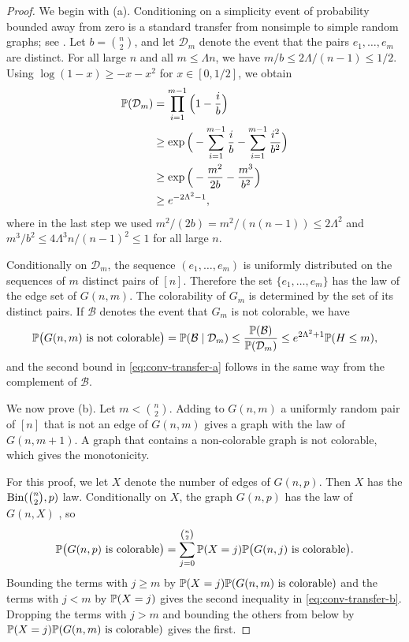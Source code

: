 \begin{proof}
We begin with (a). Conditioning on a simplicity event of probability bounded away from zero is a standard transfer from nonsimple to simple random graphs; see \cite[Section~2, paragraph on nonsimple graphs]{bayati2013combinatorial}. Let $b = \binom{n}{2}$, and let $\mathcal D_m$ denote the event that the pairs $e_1, \dots, e_m$ are distinct. For all large $n$ and all $m \le \Lambda n$, we have $m/b \le 2\Lambda/(n - 1) \le 1/2$. Using $\log(1 - x) \ge -x - x^2$ for $x \in [0, 1/2]$, we obtain
\[
\begin{aligned}
\mathbb P(\mathcal D_m) &= \prod_{i = 1}^{m - 1} \Big(1 - \frac{i}{b}\Big) \\
&\ge \exp\Big(-\sum_{i = 1}^{m - 1} \frac{i}{b} - \sum_{i = 1}^{m - 1} \frac{i^2}{b^2}\Big) \\
&\ge \exp\Big(-\frac{m^2}{2b} - \frac{m^3}{b^2}\Big) \\
&\ge e^{-2\Lambda^2 - 1},
\end{aligned}
\]
where in the last step we used $m^2/(2b) = m^2/(n(n - 1)) \le 2\Lambda^2$ and $m^3/b^2 \le 4\Lambda^3 n/(n - 1)^2 \le 1$ for all large $n$.

Conditionally on $\mathcal D_m$, the sequence $(e_1, \dots, e_m)$ is uniformly distributed on the sequences of $m$ distinct pairs of $[n]$. Therefore the set $\{e_1, \dots, e_m\}$ has the law of the edge set of $G(n, m)$. The colorability of $G_m$ is determined by the set of its distinct pairs. If $\mathcal B$ denotes the event that $G_m$ is not colorable, we have
\[
\mathbb P\big(G(n, m) \text{ is not colorable}\big) = \mathbb P(\mathcal B \mid \mathcal D_m) \le \frac{\mathbb P(\mathcal B)}{\mathbb P(\mathcal D_m)} \le e^{2\Lambda^2 + 1} \mathbb P(H \le m),
\]
and the second bound in \eqref{eq:conv-transfer-a} follows in the same way from the complement of $\mathcal B$.

We now prove (b). Let $m < \binom{n}{2}$. Adding to $G(n, m)$ a uniformly random pair of $[n]$ that is not an edge of $G(n, m)$ gives a graph with the law of $G(n, m + 1)$. A graph that contains a non-colorable graph is not colorable, which gives the monotonicity.

For this proof, we let $X$ denote the number of edges of $G(n, p)$. Then $X$ has the $\operatorname{Bin}(\binom n2, p)$ law. Conditionally on $X$, the graph $G(n, p)$ has the law of $G(n, X)$ \cite[Lemma~1.1]{frieze2016introduction}, so
\[
\mathbb P\big(G(n, p) \text{ is colorable}\big) = \sum_{j = 0}^{\binom{n}{2}} \mathbb P(X = j) \mathbb P\big(G(n, j) \text{ is colorable}\big).
\]
Bounding the terms with $j \ge m$ by $\mathbb P(X = j) \mathbb P(G(n, m) \text{ is colorable})$ and the terms with $j < m$ by $\mathbb P(X = j)$ gives the second inequality in \eqref{eq:conv-transfer-b}. Dropping the terms with $j > m$ and bounding the others from below by $\mathbb P(X = j) \mathbb P(G(n, m) \text{ is colorable})$ gives the first.
\end{proof}

